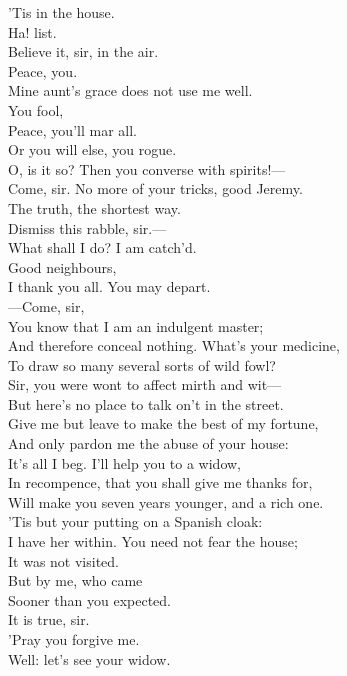 \documentclass[a4paper,oneside]{memoir}
\begin{document}
\begin{drama*}
\lovewitspeaks {} 'Tis in the house.\\
Ha! list.\\
\facespeaks {} Believe it, sir, in the air.\\
\lovewitspeaks {} Peace, you.\\
\dapperspeaks {} Mine aunt's grace does not use me well.\\
\subtlespeaks {} You fool,\\
Peace, you'll mar all.\\
\facespeaks {}
Or you will else, you rogue.\\
\lovewitspeaks {} O, is it so? Then you converse with spirits!---\\
Come, sir. No more of your tricks, good Jeremy.\\
The truth, the shortest way.\\
\facespeaks {} Dismiss this rabble, sir.---\\
What shall I do? I am catch'd.\\
\lovewitspeaks {} Good neighbours,\\
I thank you all. You may depart.\\
---Come, sir,\\
You know that I am an indulgent master;\\
And therefore conceal nothing. What's your medicine,\\
To draw so many several sorts of wild fowl?\\
\facespeaks Sir, you were wont to affect mirth and wit---\\
But here's no place to talk on't in the street.\\
Give me but leave to make the best of my fortune,\\
And only pardon me the abuse of your house:\\
It's all I beg. I'll help you to a widow,\\
In recompence, that you shall give me thanks for,\\
Will make you seven years younger, and a rich one.\\
'Tis but your putting on a Spanish cloak:\\
I have her within. You need not fear the house;\\
It was not visited.\\
\lovewitspeaks {} But by me, who came\\
Sooner than you expected.\\
\facespeaks {} It is true, sir.\\
'Pray you forgive me.\\
\lovewitspeaks {} Well: let's see your widow.\\
\scene


\end{drama*}
\end{document}
